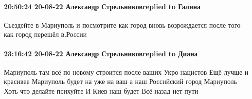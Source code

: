 \paragraph{20:50:24 20-08-22 Александр Стрельниковreplied to Галина}

Сьездейте в Мариуполь и посмотрите как город вновь возрождается после того как
город перешёл в.России

\paragraph{23:16:42 20-08-22 Александр Стрельниковreplied to Диана}

Мариуполь там всё по новому строится после ваших Укро нацистов Ещё лучше и
красивее Мариуполь будет на уже на ваш а наш Российский город Мариуполь Хоть
что делайте психуйте И Киев наш будет Всё назад нет пути

